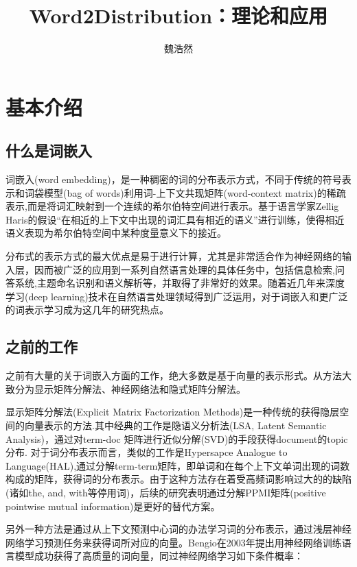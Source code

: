 \documentclass[13pt]{article}
\begin{document}
\title{Word2Distribution：理论和应用}
\author{魏浩然}
\maketitle
\section{基本介绍}
\subsection{什么是词嵌入}
词嵌入(word embedding)，是一种稠密的词的分布表示方式，不同于传统的符号表示和词袋模型(bag of words)利用词-上下文共现矩阵(word-context matrix)的稀疏表示,而是将词汇映射到一个连续的希尔伯特空间进行表示。基于语言学家Zellig Haris的假设“在相近的上下文中出现的词汇具有相近的语义”\cite{harris1954distributional}进行训练，使得相近语义表现为希尔伯特空间中某种度量意义下的接近。

分布式的表示方式的最大优点是易于进行计算，尤其是非常适合作为神经网络的输入层，因而被广泛的应用到一系列自然语言处理的具体任务中，包括信息检索\cite{manning2008introduction},问答系统\cite{tellex2003quantitative},主题命名识别\cite{turian2010word}和语义解析\cite{socher2011parsing}等，并取得了非常好的效果。随着近几年来深度学习(deep learning)技术在自然语言处理领域得到广泛运用，对于词嵌入和更广泛的词表示学习成为这几年的研究热点。

\subsection{之前的工作}
之前有大量的关于词嵌入方面的工作，绝大多数是基于向量的表示形式。从方法大致分为显示矩阵分解法、神经网络法和隐式矩阵分解法。

显示矩阵分解法(Explicit Matrix Factorization Methods)是一种传统的获得隐层空间的向量表示的方法.其中经典的工作是隐语义分析法(LSA, Latent Semantic Analysis)，通过对term-doc 矩阵进行近似分解(SVD)的手段获得document的topic分布. 对于词分布表示而言，类似的工作是Hypersapce Analogue to Language(HAL)\cite{lund1996producing},通过分解term-term矩阵，即单词和在每个上下文单词出现的词数构成的矩阵，获得词的分布表示。由于这种方法存在着受高频词影响过大的的缺陷(诸如the, and, with等停用词)，后续的研究表明通过分解PPMI矩阵(positive pointwise mutual information)是更好的替代方案\cite{lebret2013word}。

另外一种方法是通过从上下文预测中心词的办法学习词的分布表示，通过浅层神经网络学习预测任务来获得词所对应的向量。Bengio在2003年提出用神经网络训练语言模型成功获得了高质量的词向量\cite{bengio2006neural}，同过神经网络学习如下条件概率：
\end{document}
